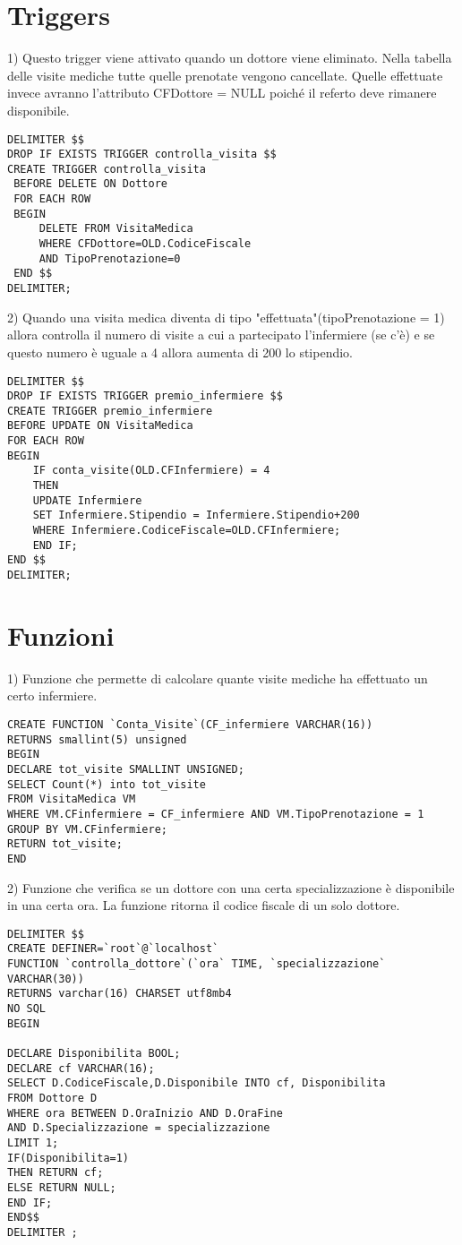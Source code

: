 \documentclass{report}
\begin{document}
\section*{Triggers}
1) Questo trigger viene attivato quando un dottore viene eliminato. Nella tabella delle visite mediche tutte quelle prenotate vengono cancellate. Quelle effettuate invece avranno l’attributo CFDottore = NULL poiché il referto deve rimanere disponibile.
\begin{verbatim}
DELIMITER $$
DROP IF EXISTS TRIGGER controlla_visita $$
CREATE TRIGGER controlla_visita
 BEFORE DELETE ON Dottore
 FOR EACH ROW
 BEGIN
     DELETE FROM VisitaMedica 
     WHERE CFDottore=OLD.CodiceFiscale 
     AND TipoPrenotazione=0
 END $$
DELIMITER;
\end{verbatim}

2) Quando una visita medica diventa di tipo "effettuata"(tipoPrenotazione = 1)
 allora controlla il numero di visite a cui a partecipato l'infermiere (se c'è)
 e se questo numero è uguale a 4 allora aumenta di 200 lo stipendio.

\begin{verbatim}
DELIMITER $$
DROP IF EXISTS TRIGGER premio_infermiere $$
CREATE TRIGGER premio_infermiere
BEFORE UPDATE ON VisitaMedica
FOR EACH ROW
BEGIN
    IF conta_visite(OLD.CFInfermiere) = 4
    THEN 
    UPDATE Infermiere
    SET Infermiere.Stipendio = Infermiere.Stipendio+200
    WHERE Infermiere.CodiceFiscale=OLD.CFInfermiere;
    END IF;
END $$
DELIMITER;
\end{verbatim}

\section*{Funzioni}
1) Funzione che permette di calcolare quante visite mediche ha effettuato un certo infermiere.

\begin{verbatim}
CREATE FUNCTION `Conta_Visite`(CF_infermiere VARCHAR(16)) 
RETURNS smallint(5) unsigned
BEGIN
DECLARE tot_visite SMALLINT UNSIGNED;
SELECT Count(*) into tot_visite
FROM VisitaMedica VM
WHERE VM.CFinfermiere = CF_infermiere AND VM.TipoPrenotazione = 1
GROUP BY VM.CFinfermiere;
RETURN tot_visite;
END
\end{verbatim}

2) Funzione che verifica se un dottore con una certa specializzazione è disponibile in una certa ora. La funzione ritorna il codice fiscale di un solo dottore.
\begin{verbatim}
DELIMITER $$
CREATE DEFINER=`root`@`localhost`
FUNCTION `controlla_dottore`(`ora` TIME, `specializzazione` VARCHAR(30)) 
RETURNS varchar(16) CHARSET utf8mb4
NO SQL
BEGIN

DECLARE Disponibilita BOOL;
DECLARE cf VARCHAR(16);
SELECT D.CodiceFiscale,D.Disponibile INTO cf, Disponibilita
FROM Dottore D
WHERE ora BETWEEN D.OraInizio AND D.OraFine
AND D.Specializzazione = specializzazione
LIMIT 1;
IF(Disponibilita=1)
THEN RETURN cf;
ELSE RETURN NULL;
END IF;
END$$
DELIMITER ;
\end{verbatim}
\end{document}
